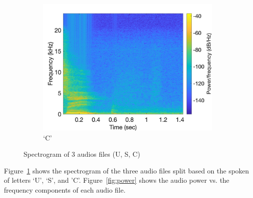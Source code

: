 \documentclass[11pt, oneside]{article}   	%
\begin{document}
\begin{figure}[ht]
\begin{subfigure}[b]{0.3\textwidth}
\includegraphics[width=\textwidth]{imgs/c.jpg}
\caption{`C'}
\end{subfigure}
\caption{Spectrogram of 3 audios files (U, S, C)}
\label{fig:threeletters}
\end{figure}

Figure~\ref{fig:threeletters} shows the spectrogram of the three audio files split based on the spoken of letters `U', `S', and 'C'. Figure~\ref{fig:power} shows the audio power vs. the frequency components of each audio file.
\end{document}
